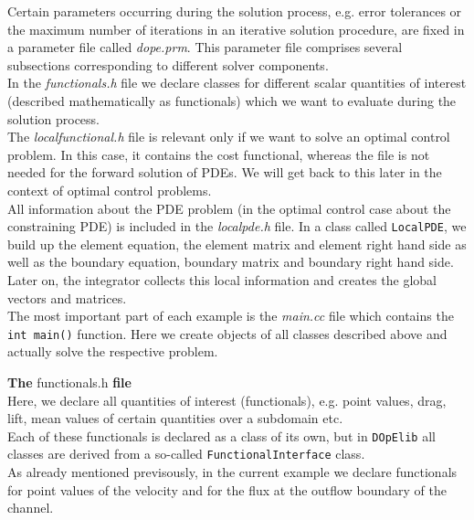 Certain parameters occurring during the solution process, e.g. error tolerances or the maximum number of iterations in an iterative solution procedure, are fixed in a parameter file called \textit{dope.prm}. This parameter file comprises several subsections corresponding to different solver components.\\

In the \textit{functionals.h} file we declare classes for different scalar quantities of interest (described mathematically as functionals) which we want to evaluate during the solution process.\\

The \textit{localfunctional.h} file is relevant only if we want to solve an optimal control problem. In this case, it contains the cost functional, whereas the file is not needed for the forward solution of PDEs. We will get back to this later in the context of optimal control problems.\\

All information about the PDE problem (in the optimal control case about the constraining PDE) is included in the \textit{localpde.h} file. In a class called \texttt{LocalPDE}, we build up the element equation, the element matrix and element right hand side as well as the boundary equation, boundary matrix and boundary right hand side. Later on, the integrator collects this local information and creates the global vectors and matrices.\\

The most important part of each example is the \textit{main.cc} file which contains the \texttt{int main()} function. Here we create objects of all classes described above and actually solve the respective problem.\\
 
\vspace{0.2cm}

\textbf{The} functionals.h \textbf{file}\\

\vspace{0.2cm}
Here, we declare all quantities of interest (functionals), e.g. point values, drag, lift, mean values of certain quantities over a subdomain etc. \\
Each of these functionals is declared as a class of its own, but in \texttt{DOpElib} all classes are derived from a so-called \texttt{FunctionalInterface} class.\\
As already mentioned previsously, in the current example we declare functionals for point values of the velocity and for the flux at the outflow boundary of the channel. \\

